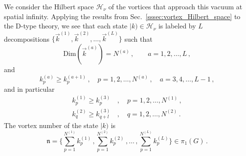\documentclass[12pt,a4paper]{article}
\newcommand{\nn}{\mathfrak{n}}
\renewcommand{\(}{\left(}
\renewcommand{\)}{\right)}
\renewcommand{\(}{\left(}
\renewcommand{\)}{\right)}
\begin{document}
We consider the Hilbert space $\mathcal{H}_\nu$ of the vortices that approach this vacuum at spatial infinity. 
Applying the results from Sec.~\ref{sssec:vortex_Hilbert_space} to the D-type theory, we see that each state $|k)\in \mathcal{H}_\nu$ is labeled by $L$ decompositions $\{\vec{k}^{(1)},\vec{k}^{(2)},\dots,\vec{k}^{(L)}\}$ such that
\begin{equation}
\text{Dim}(\vec{k}^{(a)})=N^{(a)}\,,\qquad a=1,2,\dots,L\,,
\end{equation}
and
\begin{equation}\label{eq:D_condi1}
k^{(a)}_p\geq k^{(a+1)}_p\,,\quad p=1,2,\dots,N^{(a)}\,,\quad a=3,4,\dots,L-1\,,
\end{equation}
and in particular
\begin{equation}\label{eq:D_condi2}
\begin{aligned}
k^{(1)}_p\geq k^{(3)}_p&\,,\quad p=1,2,\dots,N^{(1)}\,,\\
k^{(2)}_q\geq k^{(3)}_{q+l}&\,,\quad q=1,2,\dots,N^{(2)}\,.
\end{aligned}
\end{equation}
The vortex number of the state $|k)$ is 
\begin{equation}
\nn=\{\sum_{p=1}^{N^{(1)}}k^{(1)}_p\,,\sum_{p=1}^{N^{(2)}}k^{(2)}_p\,,\dots\,,\sum_{p=1}^{N^{(L)}}k^{(L)}_p\}\in \pi_1(G)\,.
\end{equation}
\end{document}

